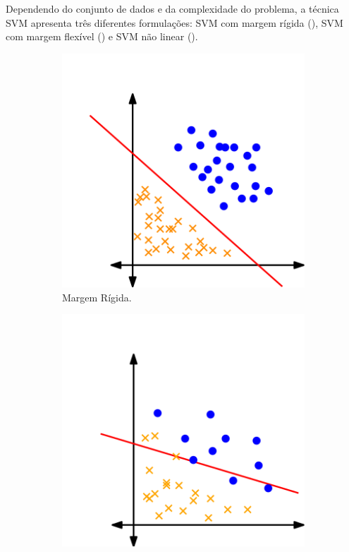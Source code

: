 \documentclass[12pt,a4paper]{scrartcl}
\theoremstyle{definition}%
\begin{document}
Dependendo do conjunto de dados e da complexidade do problema, a técnica SVM apresenta três diferentes formulações: SVM com margem rígida (), SVM com margem flexível () e SVM não linear (). 

\begin{figure}[!ht] 
\centering
\begin{subfigure}[h]{0.3\textwidth}
\centering
\includegraphics[width=\textwidth]{hiperplano_SVM_linear}
\caption{Margem Rígida. \label{fig:hiperplano_margemrigida}}
\end{subfigure}
\begin{subfigure}[!ht]{0.3\textwidth}
	\centering
	\includegraphics[width=\textwidth]{hiperplano_SVM_flexivel}

\end{subfigure}
\end{figure}
\end{document}
